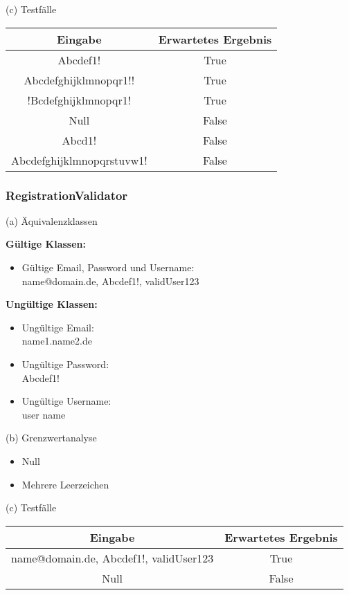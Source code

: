 (c) Testfälle\\
\begin{tabular}{ c | c }
 Eingabe & Erwartetes Ergebnis \\
 \hline
 Abcdef1! & True  \\
 Abcdefghijklmnopqr1!! & True  \\
 !Bcdefghijklmnopqr1! & True  \\
 \hline
 Null & False \\  
 Abcd1!  & False \\  
 Abcdefghijklmnopqrstuvw1!  & False \\  
\end{tabular}

\subsubsection*{RegistrationValidator}
(a) Äquivalenzklassen\\
\begin{minipage}[t]{0.48\textwidth}
\textbf{Gültige Klassen:}
\begin{itemize}
    \item Gültige Email, Password und Username: \\ name@domain.de, Abcdef1!, validUser123
\end{itemize}
\end{minipage}
\hfill
\begin{minipage}[t]{0.48\textwidth}
\textbf{Ungültige Klassen:}
\begin{itemize}
    \item Ungültige Email: \\ name1.name2.de
    \item Ungültige Password: \\ Abcdef1!
    \item Ungültige Username: \\ user name
\end{itemize}
\end{minipage}

\vspace{1em}

(b) Grenzwertanalyse
\begin{itemize}
    \item Null
    \item Mehrere Leerzeichen 
\end{itemize}

(c) Testfälle\\
\begin{tabular}{ c | c }
 Eingabe & Erwartetes Ergebnis \\
 \hline
 name@domain.de, Abcdef1!, validUser123 & True  \\
 \hline
 Null & False  \\  
\end{tabular}

